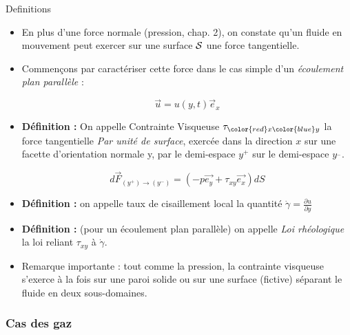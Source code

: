 \begin{frame}{Definitions}

\small

\begin{itemize}

\item En plus d'une force normale (pression, chap. 2), on constate qu'un fluide en mouvement peut exercer sur une surface $\cal S$ 
 une {\color{red} force tangentielle}.


\item Commençons par caractériser cette force dans le cas simple d'un {\em écoulement plan parallèle} : 

$$
\vec{u} = u(y,t) \vec{e}_x
$$




\item {\bf Définition :} On appelle Contrainte Visqueuse $\tau_{{\color{red} x} {\color{blue} y}}$ 
la force tangentielle {\em Par unité de surface}, exercée {\color{red} dans la direction $x$} sur une facette d'orientation normale {\color{blue} y}, par le demi-espace $y^+$ sur le demi-espace $y^_-$.


$$d \vec{F}_{(y^+)\rightarrow (y^-)} = \left( - p \vec{e_y} + \tau_{xy} \vec{e_x} \right) dS$$

\item {\bf Définition :}  on appelle taux de cisaillement local la quantité $\dot \gamma = \frac{\partial u}{\partial y}$


\item {\bf Définition :} (pour un écoulement plan parallèle) on appelle {\em Loi rhéologique} la loi reliant $\tau_{xy}$ à $\dot \gamma $.
 
\item 
Remarque importante : tout comme la pression, la contrainte visqueuse s'exerce à la fois sur une paroi solide 
ou sur une surface (fictive) séparant le fluide en deux sous-domaines.

\end{itemize}


\end{frame}


\subsubsection{Cas des gaz}

